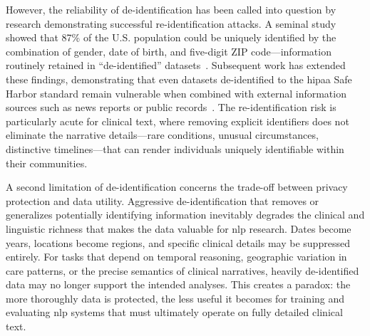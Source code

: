 However, the reliability of de-identification has been called into question by research demonstrating successful re-identification attacks. A seminal study showed that 87\% of the U.S. population could be uniquely identified by the combination of gender, date of birth, and five-digit ZIP code---information routinely retained in ``de-identified'' datasets~\citep{sweeney2002}. Subsequent work has extended these findings, demonstrating that even datasets de-identified to the \gls{hipaa} Safe Harbor standard remain vulnerable when combined with external information sources such as news reports or public records~\citep{elEmam2011}. The re-identification risk is particularly acute for clinical text, where removing explicit identifiers does not eliminate the narrative details---rare conditions, unusual circumstances, distinctive timelines---that can render individuals uniquely identifiable within their communities.

A second limitation of de-identification concerns the trade-off between privacy protection and data utility. Aggressive de-identification that removes or generalizes potentially identifying information inevitably degrades the clinical and linguistic richness that makes the data valuable for \gls{nlp} research. Dates become years, locations become regions, and specific clinical details may be suppressed entirely. For tasks that depend on temporal reasoning, geographic variation in care patterns, or the precise semantics of clinical narratives, heavily de-identified data may no longer support the intended analyses. This creates a paradox: the more thoroughly data is protected, the less useful it becomes for training and evaluating \gls{nlp} systems that must ultimately operate on fully detailed clinical text.

